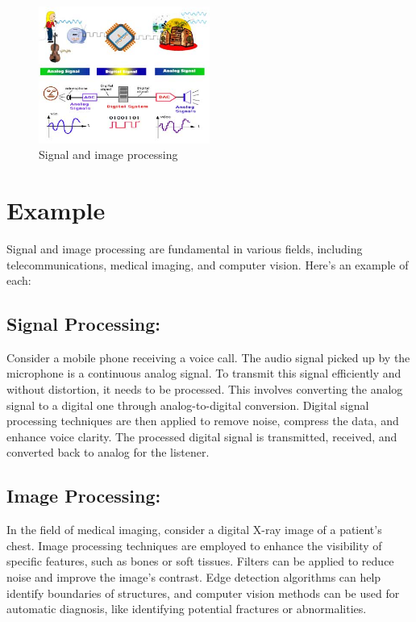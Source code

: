 \documentclass{article}
\begin{document}
\begin{figure}[h]
        \centering
        \includegraphics[width=0.5\textwidth]{signalprocessing.jpg}
        \caption{Signal and image processing}
        \label{fig:enter-label}
    \end{figure}

\section{Example}
Signal and image processing are fundamental in various fields, including telecommunications, medical imaging, and computer vision. Here's an example of each:

\subsection{Signal Processing:}
Consider a mobile phone receiving a voice call. The audio signal picked up by the microphone is a continuous analog signal. To transmit this signal efficiently and without distortion, it needs to be processed. This involves converting the analog signal to a digital one through analog-to-digital conversion. Digital signal processing techniques are then applied to remove noise, compress the data, and enhance voice clarity. The processed digital signal is transmitted, received, and converted back to analog for the listener.

\subsection{Image Processing:}
In the field of medical imaging, consider a digital X-ray image of a patient's chest. Image processing techniques are employed to enhance the visibility of specific features, such as bones or soft tissues. Filters can be applied to reduce noise and improve the image's contrast. Edge detection algorithms can help identify boundaries of structures, and computer vision methods can be used for automatic diagnosis, like identifying potential fractures or abnormalities.
\end{document}
